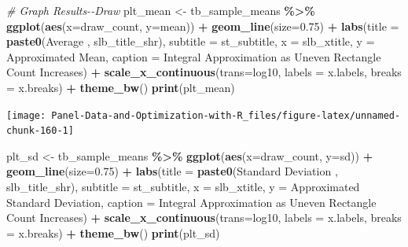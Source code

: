 \documentclass[
]{book}
\newenvironment{Shaded}{\begin{snugshade}}{\end{snugshade}}
\newcommand{\CommentTok}[1]{\textcolor[rgb]{0.56,0.35,0.01}{\textit{#1}}}
\newcommand{\DataTypeTok}[1]{\textcolor[rgb]{0.13,0.29,0.53}{#1}}
\newcommand{\FloatTok}[1]{\textcolor[rgb]{0.00,0.00,0.81}{#1}}
\newcommand{\KeywordTok}[1]{\textcolor[rgb]{0.13,0.29,0.53}{\textbf{#1}}}
\newcommand{\NormalTok}[1]{#1}
\newcommand{\OperatorTok}[1]{\textcolor[rgb]{0.81,0.36,0.00}{\textbf{#1}}}
\newcommand{\StringTok}[1]{\textcolor[rgb]{0.31,0.60,0.02}{#1}}
\begin{document}
\begin{Shaded}
\begin{Highlighting}[]
\CommentTok{\# Graph Results{-}{-}Draw}
\NormalTok{plt\_mean \textless{}{-}}\StringTok{ }\NormalTok{tb\_sample\_means }\OperatorTok{\%\textgreater{}\%}
\StringTok{  }\KeywordTok{ggplot}\NormalTok{(}\KeywordTok{aes}\NormalTok{(}\DataTypeTok{x=}\NormalTok{draw\_count, }\DataTypeTok{y=}\NormalTok{mean)) }\OperatorTok{+}
\StringTok{  }\KeywordTok{geom\_line}\NormalTok{(}\DataTypeTok{size=}\FloatTok{0.75}\NormalTok{) }\OperatorTok{+}
\StringTok{  }\KeywordTok{labs}\NormalTok{(}\DataTypeTok{title =} \KeywordTok{paste0}\NormalTok{(}\StringTok{\textquotesingle{}Average \textquotesingle{}}\NormalTok{, slb\_title\_shr),}
       \DataTypeTok{subtitle =}\NormalTok{ st\_subtitle,}
       \DataTypeTok{x =}\NormalTok{ slb\_xtitle,}
       \DataTypeTok{y =} \StringTok{\textquotesingle{}Approximated Mean\textquotesingle{}}\NormalTok{,}
       \DataTypeTok{caption =} \StringTok{\textquotesingle{}Integral Approximation as Uneven Rectangle Count Increases\textquotesingle{}}\NormalTok{) }\OperatorTok{+}
\StringTok{  }\KeywordTok{scale\_x\_continuous}\NormalTok{(}\DataTypeTok{trans=}\StringTok{\textquotesingle{}log10\textquotesingle{}}\NormalTok{, }\DataTypeTok{labels =}\NormalTok{ x.labels, }\DataTypeTok{breaks =}\NormalTok{ x.breaks) }\OperatorTok{+}
\StringTok{  }\KeywordTok{theme\_bw}\NormalTok{()}
\KeywordTok{print}\NormalTok{(plt\_mean)}
\end{Highlighting}
\end{Shaded}

\begin{center}\texttt{[image: Panel-Data-and-Optimization-with-R\_files/figure-latex/unnamed-chunk-160-1]} \end{center}

\begin{Shaded}
\begin{Highlighting}[]
\NormalTok{plt\_sd \textless{}{-}}\StringTok{ }\NormalTok{tb\_sample\_means }\OperatorTok{\%\textgreater{}\%}
\StringTok{  }\KeywordTok{ggplot}\NormalTok{(}\KeywordTok{aes}\NormalTok{(}\DataTypeTok{x=}\NormalTok{draw\_count, }\DataTypeTok{y=}\NormalTok{sd)) }\OperatorTok{+}
\StringTok{  }\KeywordTok{geom\_line}\NormalTok{(}\DataTypeTok{size=}\FloatTok{0.75}\NormalTok{) }\OperatorTok{+}
\StringTok{  }\KeywordTok{labs}\NormalTok{(}\DataTypeTok{title =} \KeywordTok{paste0}\NormalTok{(}\StringTok{\textquotesingle{}Standard Deviation \textquotesingle{}}\NormalTok{, slb\_title\_shr),}
       \DataTypeTok{subtitle =}\NormalTok{ st\_subtitle,}
       \DataTypeTok{x =}\NormalTok{ slb\_xtitle,}
       \DataTypeTok{y =} \StringTok{\textquotesingle{}Approximated Standard Deviation\textquotesingle{}}\NormalTok{,}
       \DataTypeTok{caption =} \StringTok{\textquotesingle{}Integral Approximation as Uneven Rectangle Count Increases\textquotesingle{}}\NormalTok{) }\OperatorTok{+}
\StringTok{  }\KeywordTok{scale\_x\_continuous}\NormalTok{(}\DataTypeTok{trans=}\StringTok{\textquotesingle{}log10\textquotesingle{}}\NormalTok{, }\DataTypeTok{labels =}\NormalTok{ x.labels, }\DataTypeTok{breaks =}\NormalTok{ x.breaks) }\OperatorTok{+}
\StringTok{  }\KeywordTok{theme\_bw}\NormalTok{()}
\KeywordTok{print}\NormalTok{(plt\_sd)}
\end{Highlighting}
\end{Shaded}
\end{document}

